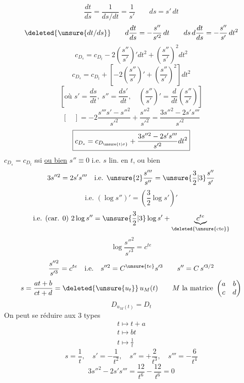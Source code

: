 \[
\frac{dt}{ds}=\frac1{ds/dt}=\frac1{s'}\qquad ds=s'\,dt
\]
\[
\deleted{\unsure{dt/ds}}\qquad d\frac{dt}{ds}=-\frac{s''}{s'^2}\,dt
\qquad ds\,d\frac{dt}{ds}=-\frac{s''}{s'}\,dt^2
\]
\[
c_{D_s}=c_{D_t}-2\left(\frac{s''}{s'}\right)'dt^2+\left(\frac{s''}{s'}\right)^2dt^2
\]
\[
\boxed{c_{D_s}=c_{D_t}+\left[-2\left(\frac{s''}{s'}\right)'+\left(\frac{s''}{s'}\right)^2\right]dt^2}
\]
\[
\left[\text{où }s'=\frac{ds}{dt},\ s''=\frac{ds'}{dt},\quad
\left(\frac{s''}{s'}\right)'=\frac d{dt}\left(\frac{s''}{s'}\right)\right]
\]
\[
[\quad]=-2\frac{s'''s'-s''^2}{s'^2}+\frac{s''^2}{s'^2}
=\frac{3s''^2-2s's'''}{s'^2}
\]
\[
\boxed{c_{D_s}=c_{D_{\unsure{t|\sigma}}}+\frac{3s''^2-2s's'''}{s'^2}dt^2}
\]
 $c_{D_s}=c_{D_t}$ ssi \uline{ou bien} $s''\equiv0$ i.e. $s$ lin. en $t$, ou bien
\[
3s''^2=2s's'''\quad\text{i.e. }\unsure{2}\frac{s'''}{s''}=\unsure{\frac32|3}\frac{s''}{s'}
\]
\[
\text{i.e. }(\log s'')'=\left(\frac32\log s'\right)'
\]
\[
\text{i.e. (car. 0) }2\log s''=\unsure{\frac32|3}\log s'+\underbrace{c^{te}}_{\deleted{\unsure{\mathrm{cte}}}}
\]
\[
\log\frac{s''^2}{s'^3}=c^{te}
\]
\[
\frac{s''^2}{s'^3}=c^{te}\quad\text{i.e.}\quad s''^2=C^{\unsure{te}}s'^3
\qquad s''=C\,s'^{3/2}
\]
\[
s=\frac{at+b}{ct+d}=\deleted{\unsure{u_t}}\,u_M(t)\qquad
M\text{ la matrice }\begin{pmatrix}a&b\\c&d\end{pmatrix}
\]
\[
D_{u_M(t)}=D_t
\]
On peut se réduire aux 3 types 
\[
\begin{gathered}
t\longmapsto t+a\\
t\longmapsto bt\\
t\longmapsto\frac1t
\end{gathered}
\]
\[
s=\frac1t,\quad s'=-\frac1{t^2},\quad s''=+\frac2{t^3},\quad s'''=-\frac6{t^4}
\]
\[
3s''^2-2s's'''=\frac{12}{t^6}-\frac{12}{t^6}=0
\]

